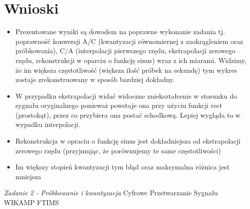 \documentclass[12pt]{article}
\begin{document}
\section{Wnioski}
\begin {itemize}
\item Prezentowane wyniki są dowodem na poprawne wykonanie zadania tj. poprawność konwersji A/C (kwantyzacji równomiernej z zaokrągleniem oraz próbkowania), C/A (interpolacji pierwszego rzędu, ekstrapolacji zerowego rzędu, rekonstrukcji w oparciu o funkcję sinus) wraz z ich miarami. Widzimy, że im większa częstotliwość (większa ilość próbek na sekundę) tym wykres zostaje zrekonstruowany w sposób bardziej dokładny.
\item W przypadku ekstrapolacji widać widoczne zniekształcenie w stosunku do sygnału oryginalnego ponieważ powstaje ona przy użyciu funkcji rect (prostokąt), przez co przybiera ona postać schodkową. Lepiej wygląda to w wypadku interpolacji.
\item Rekonstrukcja w opraciu o funkcję sinus jest dokładniejsza od ekstrapolacji zerowego rzędu (przyjmując, że porównujemy te same częstotliwości)
\item Im większy stopień kwantyzacji tym błąd oraz maksymalna różnica jest mniejsza
\end {itemize}


\begin{thebibliography}{0}
\label{zad1}
\textit{Zadanie 2 - Próbkowanie i kwantyzacja} Cyfrowe Przetwarzanie Sygnału WIKAMP FTIMS\newline
\end{thebibliography}
\end{document}
